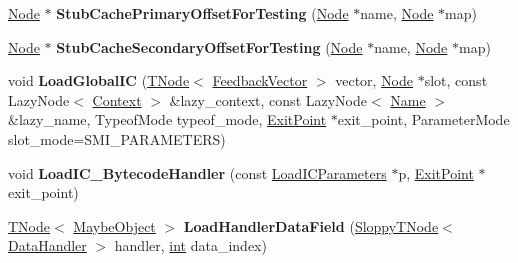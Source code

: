 \begin{DoxyCompactItemize}
\item 
\mbox{\label{classv8_1_1internal_1_1AccessorAssembler_a5c64f57e40af257c1892f3c59ff2e403}} 
\mbox{\hyperlink{classv8_1_1internal_1_1compiler_1_1Node}{Node}} $\ast$ {\bfseries Stub\+Cache\+Primary\+Offset\+For\+Testing} (\mbox{\hyperlink{classv8_1_1internal_1_1compiler_1_1Node}{Node}} $\ast$name, \mbox{\hyperlink{classv8_1_1internal_1_1compiler_1_1Node}{Node}} $\ast$map)
\item 
\mbox{\label{classv8_1_1internal_1_1AccessorAssembler_a46a3bc8482b1bb197725fbdc05184151}} 
\mbox{\hyperlink{classv8_1_1internal_1_1compiler_1_1Node}{Node}} $\ast$ {\bfseries Stub\+Cache\+Secondary\+Offset\+For\+Testing} (\mbox{\hyperlink{classv8_1_1internal_1_1compiler_1_1Node}{Node}} $\ast$name, \mbox{\hyperlink{classv8_1_1internal_1_1compiler_1_1Node}{Node}} $\ast$map)
\item 
\mbox{\label{classv8_1_1internal_1_1AccessorAssembler_ab34e9435b84e52bb6b45cbbe9306e48c}} 
void {\bfseries Load\+Global\+IC} (\mbox{\hyperlink{classv8_1_1internal_1_1compiler_1_1TNode}{T\+Node}}$<$ \mbox{\hyperlink{classv8_1_1internal_1_1FeedbackVector}{Feedback\+Vector}} $>$ vector, \mbox{\hyperlink{classv8_1_1internal_1_1compiler_1_1Node}{Node}} $\ast$slot, const Lazy\+Node$<$ \mbox{\hyperlink{classv8_1_1internal_1_1Context}{Context}} $>$ \&lazy\+\_\+context, const Lazy\+Node$<$ \mbox{\hyperlink{classv8_1_1internal_1_1Name}{Name}} $>$ \&lazy\+\_\+name, Typeof\+Mode typeof\+\_\+mode, \mbox{\hyperlink{classv8_1_1internal_1_1ExitPoint}{Exit\+Point}} $\ast$exit\+\_\+point, Parameter\+Mode slot\+\_\+mode=S\+M\+I\+\_\+\+P\+A\+R\+A\+M\+E\+T\+E\+RS)
\item 
\mbox{\label{classv8_1_1internal_1_1AccessorAssembler_a85d65e97ff44089ace23b4a5473328f6}} 
void {\bfseries Load\+I\+C\+\_\+\+Bytecode\+Handler} (const \mbox{\hyperlink{structv8_1_1internal_1_1AccessorAssembler_1_1LoadICParameters}{Load\+I\+C\+Parameters}} $\ast$p, \mbox{\hyperlink{classv8_1_1internal_1_1ExitPoint}{Exit\+Point}} $\ast$exit\+\_\+point)
\item 
\mbox{\label{classv8_1_1internal_1_1AccessorAssembler_a1d6263170cec57726ff3a77349c5aa1e}} 
\mbox{\hyperlink{classv8_1_1internal_1_1compiler_1_1TNode}{T\+Node}}$<$ \mbox{\hyperlink{classv8_1_1internal_1_1MaybeObject}{Maybe\+Object}} $>$ {\bfseries Load\+Handler\+Data\+Field} (\mbox{\hyperlink{classv8_1_1internal_1_1compiler_1_1SloppyTNode}{Sloppy\+T\+Node}}$<$ \mbox{\hyperlink{classv8_1_1internal_1_1DataHandler}{Data\+Handler}} $>$ handler, \mbox{\hyperlink{classint}{int}} data\+\_\+index)
\end{DoxyCompactItemize}
